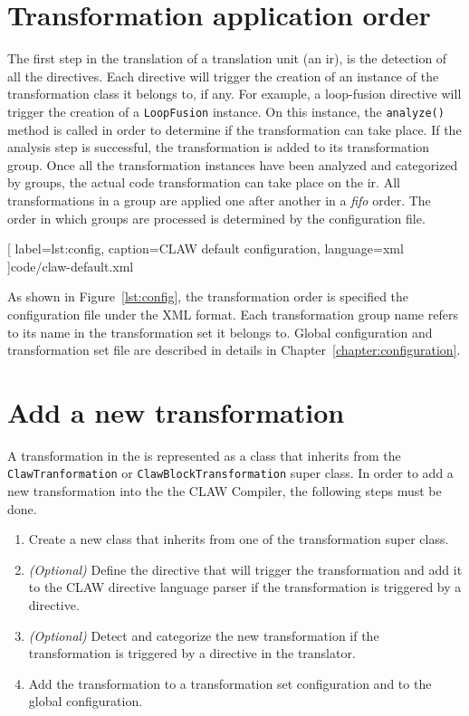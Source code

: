 \section{Transformation application order}
The first step in the translation of a translation unit (an \xcodeml \gls{ir}),
is the detection of all the directives. Each directive will trigger the
creation of an instance of the transformation class it belongs to, if any. 
For example, a loop-fusion directive will trigger the creation of a 
\lstinline|LoopFusion| instance. On this instance, the \lstinline|analyze()| 
method is called in order to determine if the transformation can take place.
If the analysis step is successful, the transformation is added to its 
transformation group. Once all the transformation instances have been analyzed
and categorized by groups, the actual code transformation can take place on 
the \xcodeml \gls{ir}. All transformations in a group are applied one after 
another in a \textit{fifo} order. The order in which groups are processed is 
determined by the configuration file.


  [
    label=lst:config,
    caption=CLAW default configuration,
    language=xml
  ]{code/claw-default.xml}

As shown in Figure~\ref{lst:config}, the transformation order is specified the
configuration file under the XML format.
Each transformation group name refers to its name in the transformation set it
belongs to. Global configuration and transformation set file are described in
details in Chapter~\ref{chapter:configuration}.

\section{Add a new transformation}
\label{section:new_trans}
A transformation in the \clawfc is represented as a class that inherits from
the \lstinline|ClawTranformation| or \lstinline|ClawBlockTransformation|
super class. In order to add a new transformation into the the CLAW Compiler,
the following steps must be done.

\begin{enumerate}
\item Create a new class that inherits from one of the transformation
      super class.
\item \textit{(Optional)} Define the directive that will trigger the 
      transformation and add it to the CLAW directive language parser if the 
      transformation is triggered by a directive.
\item \textit{(Optional)} Detect and categorize the new transformation if the 
      transformation is triggered by a directive in the translator.
\item Add the transformation to a transformation set configuration and to
      the global configuration.
\end{enumerate}

